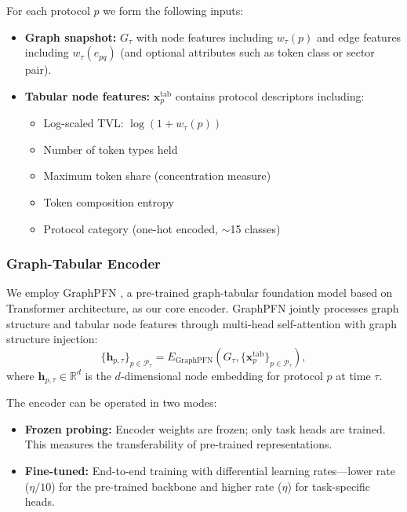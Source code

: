 For each protocol $p$ we form the following inputs:
\begin{itemize}
  \item \textbf{Graph snapshot:} $G_{\tau}$ with node features including $w_{\tau}(p)$ and edge features including $w_{\tau}(e_{pq})$ (and optional attributes such as token class or sector pair).
  \item \textbf{Tabular node features:} $\mathbf{x}^{\mathrm{tab}}_{p}$ contains protocol descriptors including:
  \begin{itemize}
    \item Log-scaled TVL: $\log(1 + w_{\tau}(p))$
    \item Number of token types held
    \item Maximum token share (concentration measure)
    \item Token composition entropy
    \item Protocol category (one-hot encoded, $\sim$15 classes)
  \end{itemize}
\end{itemize}

\subsubsection{Graph-Tabular Encoder}
We employ GraphPFN \cite{eremeev2025g2tfm}, a pre-trained graph-tabular foundation model based on Transformer architecture, as our core encoder. GraphPFN jointly processes graph structure and tabular node features through multi-head self-attention with graph structure injection:
\begin{equation}
\{\mathbf{h}_{p,\tau}\}_{p\in\mathcal{P}_{\tau}} = E_{\mathrm{GraphPFN}}\!\left(G_{\tau}, \{\mathbf{x}^{\mathrm{tab}}_{p}\}_{p\in\mathcal{P}_{\tau}}\right),
\end{equation}
where $\mathbf{h}_{p,\tau}\in\mathbb{R}^d$ is the $d$-dimensional node embedding for protocol $p$ at time $\tau$.

The encoder can be operated in two modes:
\begin{itemize}
  \item \textbf{Frozen probing:} Encoder weights are frozen; only task heads are trained. This measures the transferability of pre-trained representations.
  \item \textbf{Fine-tuned:} End-to-end training with differential learning rates---lower rate ($\eta/10$) for the pre-trained backbone and higher rate ($\eta$) for task-specific heads.
\end{itemize}

